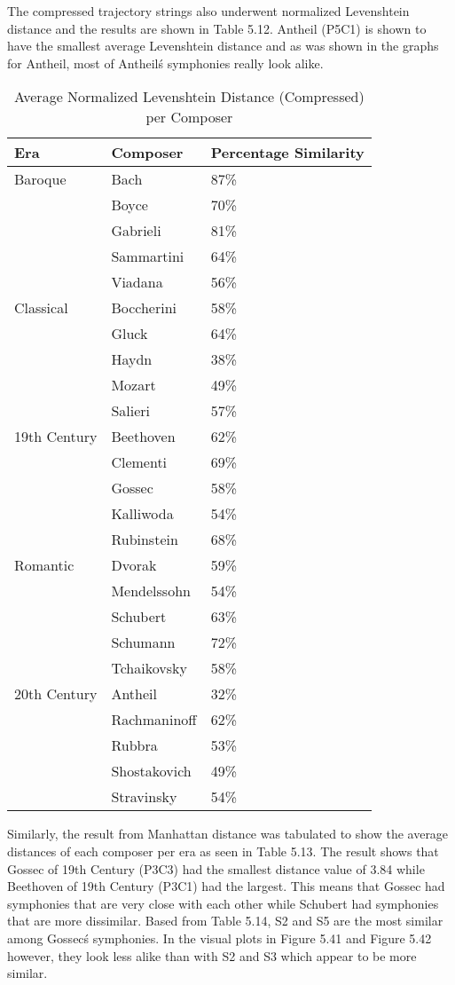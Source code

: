 The compressed trajectory strings also underwent normalized Levenshtein distance and the results are shown in Table 5.12. Antheil (P5C1) is shown to have the smallest average Levenshtein distance and as was shown in the graphs for Antheil, most of Antheil\'s symphonies really look alike.

\begin{longtable}{|l|l|l|}
\caption{Average Normalized Levenshtein Distance (Compressed) per Composer}
\label{my-label}\\
\hline
Era & Composer & Percentage Similarity \\ \hline
\endfirsthead
%
\endhead
%
Baroque & Bach & 87\% \\ \hline
 & Boyce & 70\% \\ \hline
 & Gabrieli & 81\% \\ \hline
 & Sammartini & 64\% \\ \hline
 & Viadana & 56\% \\ \hline
Classical & Boccherini & 58\% \\ \hline
 & Gluck & 64\% \\ \hline
 & Haydn & 38\% \\ \hline
 & Mozart & 49\% \\ \hline
 & Salieri & 57\% \\ \hline
19th Century & Beethoven & 62\% \\ \hline
 & Clementi & 69\% \\ \hline
 & Gossec & 58\% \\ \hline
 & Kalliwoda & 54\% \\ \hline
 & Rubinstein & 68\% \\ \hline
Romantic & Dvorak & 59\% \\ \hline
 & Mendelssohn & 54\% \\ \hline
 & Schubert & 63\% \\ \hline
 & Schumann & 72\% \\ \hline
 & Tchaikovsky & 58\% \\ \hline
20th Century & Antheil & 32\% \\ \hline
 & Rachmaninoff & 62\% \\ \hline
 & Rubbra & 53\% \\ \hline
 & Shostakovich & 49\% \\ \hline
 & Stravinsky & 54\% \\ \hline
\end{longtable}

Similarly, the result from Manhattan distance was tabulated to show the average distances of each composer per era as seen in Table 5.13. The result shows that Gossec of 19th Century  (P3C3) had the smallest distance value of 3.84 while Beethoven of 19th Century (P3C1) had the largest. This means that Gossec had symphonies that are very close with each other while Schubert had symphonies that are more dissimilar. Based from Table 5.14, S2 and S5 are the most similar among Gossec\'s symphonies. In the visual plots in Figure 5.41 and Figure 5.42 however, they look less alike than with S2 and S3 which appear to be more similar.

